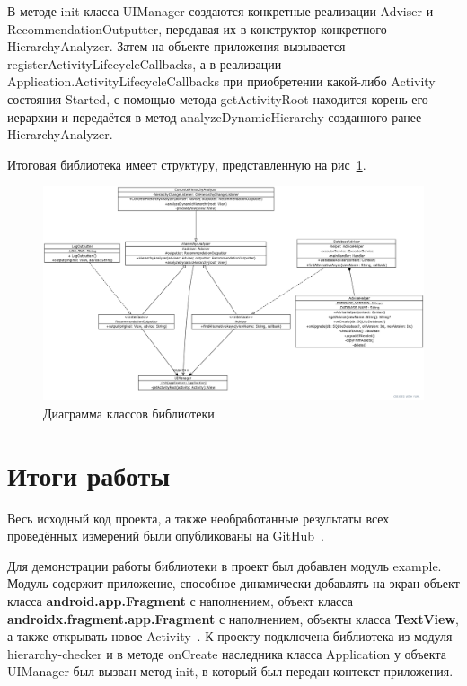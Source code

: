 \documentclass[a4paper,14pt]{extarticle} %
\begin{document}
	В методе init класса UIManager создаются конкретные реализации Adviser и RecommendationOutputter, передавая их в конструктор конкретного HierarchyAnalyzer. Затем на объекте приложения вызывается registerActivityLifecycleCallbacks, а в реализации Application.ActivityLifecycleCallbacks при приобретении какой-либо Activity состояния Started, с помощью метода getActivityRoot находится корень его иерархии и передаётся в метод analyzeDynamicHierarchy созданного ранее HierarchyAnalyzer.
	
	Итоговая библиотека имеет структуру, представленную на рис~\ref{fig:uml}.
	
	\begin{figure}[htb]
		\includegraphics[width=\textwidth]{uml}
		\caption{Диаграмма классов библиотеки}
		\label{fig:uml}
	\end{figure}
	
	\newpage
	\section{Итоги работы}
	
	Весь исходный код проекта, а также необработанные результаты всех проведённых измерений были опубликованы на GitHub~\parencite{GitHub}.
	
	Для демонстрации работы библиотеки в проект был добавлен модуль example. Модуль содержит приложение, способное динамически добавлять на экран объект класса \textbf{android.app.Fragment} с наполнением, объект класса \textbf{androidx.fragment.app.Fragment} с наполнением, объекты класса \textbf{TextView}, а также открывать новое Activity~\ris{\ref{fig:example}}. К проекту подключена библиотека из модуля hierarchy-checker и в методе onCreate наследника класса Application у объекта UIManager был вызван метод init, в который был передан контекст приложения.
	
\end{document}
